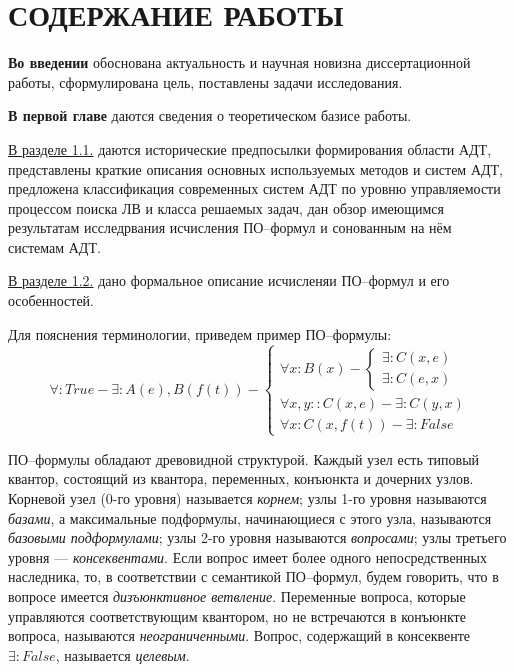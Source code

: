 \documentclass[a4paper]{report}
\begin{document}
\section*{СОДЕРЖАНИЕ РАБОТЫ}


\textbf{Во введении} обоснована актуальность и научная новизна диссертационной работы, сформулирована цель, поставлены задачи исследования.


\textbf{В первой главе} даются сведения о теоретическом базисе работы.

\underline{В разделе 1.1.} даются исторические предпосылки формирования области АДТ, представлены краткие описания основных используемых методов и систем АДТ, предложена классификация современных систем АДТ по уровню управляемости процессом поиска ЛВ и класса решаемых задач, дан обзор имеющимся результатам исследрвания исчисления ПО--формул и сонованным на нём системам АДТ.

\underline{В разделе 1.2.} дано формальное описание исчисленяи ПО--формул и его особенностей.

Для пояснения терминологии, приведем пример ПО--формулы:
$$
\forall\colon True - \exists: A(e),B(f(t)) - \left\{
\begin{array}{lcl}
 \forall x \colon B(x) - \left\{
     \begin{array}{lcl}
     \exists \colon C(x,e) \\
     \exists \colon C(e,x)
    \end{array}\right. \\
 \forall x,y \colon \colon C(x,e) - \exists : C(y,x) \\
 \forall x \colon C(x,f(t)) - \exists : False
\end{array}
\right.
$$

ПО--формулы обладают древовидной структурой. Каждый узел есть типовый квантор, состоящий из квантора, переменных, конъюнкта и дочерних узлов. Корневой узел (0-го уровня) называется \emph{корнем}; узлы 1-го уровня называются \emph{базами}, а максимальные подформулы, начинающиеся с этого узла, называются \emph{базовыми подформулами}; узлы 2-го уровня называются \emph{вопросами}; узлы третьего уровня --- \emph{консеквентами}. Если вопрос имеет более одного непосредственных наследника, то, в соответствии с семантикой ПО--формул, будем говорить, что в вопросе имеется \emph{дизъюнктивное ветвление}. Переменные вопроса, которые управляются соответствующим квантором, но не встречаются в конъюнкте вопроса, называются \emph{неограниченными}. Вопрос, содержащий в консеквенте $\exists: False$, называется \emph{целевым}.
\end{document}
